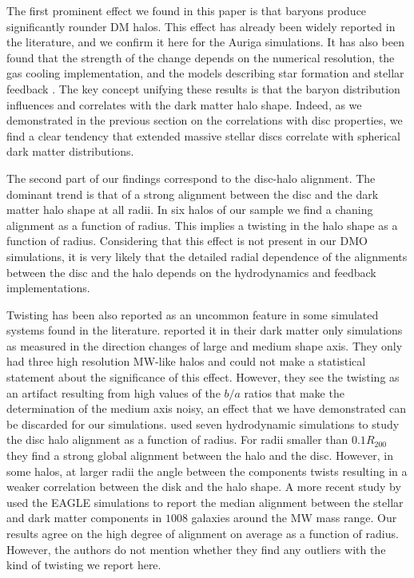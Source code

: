 \documentclass[usenatbib]{mnras}
\begin{document}
The first prominent effect we found in this paper is that  baryons produce
significantly rounder DM halos. This effect has already been  widely 
reported in the literature, and we confirm it here for the Auriga simulations.
It has also been found that the strength of the change depends on the
numerical resolution, the gas cooling implementation, and the
models describing star formation and stellar feedback
\citep{Bailin05,Debattista08, Bryan13, Butsky16, Chua19, Artale19}.  
The key concept unifying these results is that the baryon distribution
influences and correlates with the dark matter halo shape. 
Indeed, as we demonstrated in the previous section on the correlations
with disc properties, we find a clear tendency that extended
massive stellar discs correlate with spherical dark matter
distributions.  

The second part of our findings correspond to the disc-halo alignment.
The dominant trend is that of a strong alignment between
the disc and the dark matter halo shape at all radii. 
In six halos of our sample we find a chaning alignment as a function
of radius.
This implies a twisting in the halo shape as a function of
radius.
Considering that this effect is not present in our DMO simulations, it is
very likely that the detailed radial dependence of the alignments
between the disc and the halo depends on the hydrodynamics and
feedback implementations. 

Twisting has been also reported as an uncommon feature in some 
simulated systems found in the literature. 
\cite{JingSuto02} reported it in their dark
matter only simulations as measured in the direction changes of large
and medium shape axis. 
They only had three high resolution MW-like halos and could not make a
statistical statement about the significance of this effect.
However, they see the twisting as an artifact resulting from high
values  of the $b/a$ ratios that make the determination of the medium
axis noisy, an effect that we have demonstrated can be discarded for
our simulations.
\cite{Bailin05} used seven hydrodynamic simulations to study the disc
halo alignment as a function of radius.
For radii smaller than $0.1R_{200}$ they find a strong global
alignment between the halo and the disc.
However, in some halos, at larger radii the angle between the
components twists resulting in a weaker correlation between the disk
and the halo shape. 
A more recent study by \cite{2015MNRAS.453..721V} used the EAGLE simulations to
report the median alignment between the stellar and dark matter
components in $1008$ galaxies around the MW mass range. 
Our results agree on the high degree of alignment on average as a
function of radius.
However, the authors do not mention whether they find any outliers
with the kind of twisting we report here. 
\end{document}
